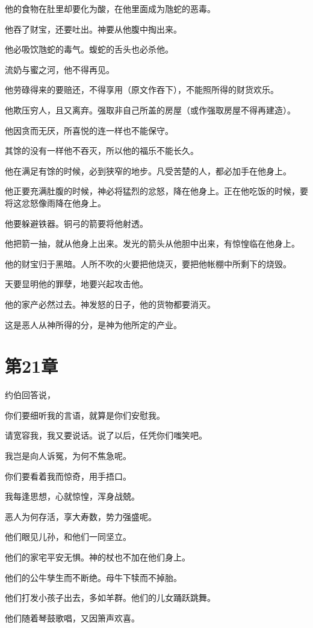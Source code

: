 \documentclass[12pt,oneside]{book}
\begin{document}
他的食物在肚里却要化为酸，在他里面成为虺蛇的恶毒。

他吞了财宝，还要吐出。神要从他腹中掏出来。

他必吸饮虺蛇的毒气。蝮蛇的舌头也必杀他。

流奶与蜜之河，他不得再见。

他劳碌得来的要赔还，不得享用（原文作吞下），不能照所得的财货欢乐。

他欺压穷人，且又离弃。强取非自己所盖的房屋（或作强取房屋不得再建造）。

他因贪而无厌，所喜悦的连一样也不能保守。

其馀的没有一样他不吞灭，所以他的福乐不能长久。

他在满足有馀的时候，必到狭窄的地步。凡受苦楚的人，都必加手在他身上。

他正要充满肚腹的时候，神必将猛烈的忿怒，降在他身上。正在他吃饭的时候，要将这忿怒像雨降在他身上。

他要躲避铁器。铜弓的箭要将他射透。

他把箭一抽，就从他身上出来。发光的箭头从他胆中出来，有惊惶临在他身上。

他的财宝归于黑暗。人所不吹的火要把他烧灭，要把他帐棚中所剩下的烧毁。

天要显明他的罪孽，地要兴起攻击他。

他的家产必然过去。神发怒的日子，他的货物都要消灭。

这是恶人从神所得的分，是神为他所定的产业。


\chapter{第21章}
约伯回答说，

你们要细听我的言语，就算是你们安慰我。

请宽容我，我又要说话。说了以后，任凭你们嗤笑吧。

我岂是向人诉冤，为何不焦急呢。

你们要看着我而惊奇，用手捂口。

我每逢思想，心就惊惶，浑身战兢。

恶人为何存活，享大寿数，势力强盛呢。

他们眼见儿孙，和他们一同坚立。

他们的家宅平安无惧。神的杖也不加在他们身上。

他们的公牛孳生而不断绝。母牛下犊而不掉胎。

他们打发小孩子出去，多如羊群。他们的儿女踊跃跳舞。

他们随着琴鼓歌唱，又因箫声欢喜。
\end{document}
